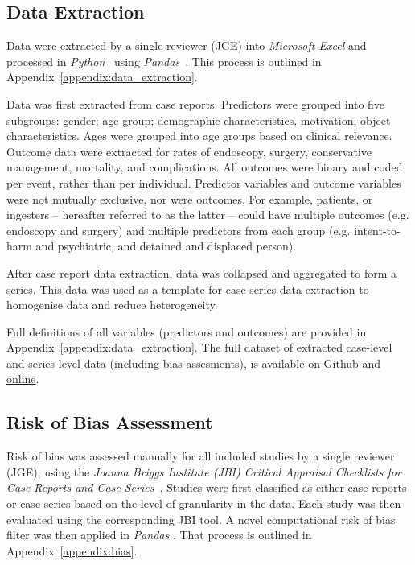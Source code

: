 \subsection{Data Extraction}

\noindent Data were extracted by a single reviewer (JGE) into \textit{Microsoft Excel} \cite{MicrosoftCorporation_2025} and processed in \textit{Python}~\cite{PythonSoftwareFoundation_2025} using \textit{Pandas}~\cite{ThePandasDevelopmentTeam_2020}. This process is outlined in Appendix~\ref{appendix:data_extraction}. 

Data was first extracted from case reports. Predictors were grouped into five subgroups: gender; age group; demographic characteristics, motivation; object characteristics. Ages were grouped into age groups based on clinical relevance. Outcome data were extracted for rates of endoscopy, surgery, conservative management, mortality, and complications. All outcomes were binary and coded per event, rather than per individual. Predictor variables and outcome variables were not mutually exclusive, nor were outcomes. For example, patients, or ingesters -- hereafter referred to as the latter -- could have multiple outcomes (e.g. endoscopy and surgery) and multiple predictors from each group (e.g. intent-to-harm and psychiatric, and detained and displaced person).

After case report data extraction, data was collapsed and aggregated to form a series. This data was used as a template for case series data extraction to homogenise data and reduce heterogeneity. 

Full definitions of all variables (predictors and outcomes) are provided in Appendix~\ref{appendix:data_extraction}. The full dataset of extracted \href{https://github.com/jackgedge/iifo_systematic_review/blob/main/input/processed_data/final_report/case_data_export.csv}{case-level} and \href{https://github.com/jackgedge/iifo_systematic_review/blob/main/input/processed_data/final_report/aggregate_series_data_export.csv}{series-level} data (including bias assesments), is available on \href{https://github.com/jackgedge/iifo_systematic_review/blob/main/input/processed_data/final_report/}{Github} and \href{https://qmro.qmul.ac.uk/xmlui/handle/123456789/113411/}{online}.

\subsection{Risk of Bias Assessment}

\noindent Risk of bias was assessed manually for all included studies by a single reviewer (JGE), using the \textit{Joanna Briggs Institute (JBI) Critical Appraisal Checklists for Case Reports and Case Series}~\cite{Moola_2020}. Studies were first classified as either case reports or case series based on the level of granularity in the data. Each study was then evaluated using the corresponding JBI tool. A novel computational risk of bias filter was then applied in \textit{Pandas} \cite{ThePandasDevelopmentTeam_2020}. That process is outlined in Appendix~\ref{appendix:bias}.

